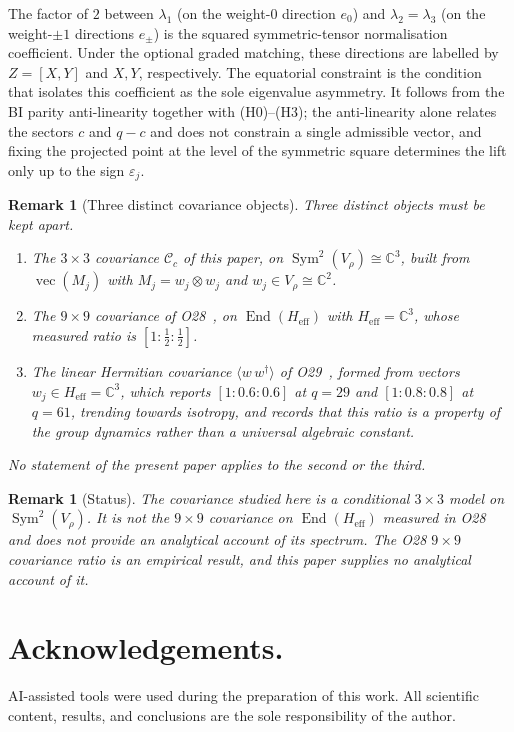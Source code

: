 \documentclass[11pt,a4paper]{article}
\newtheorem{remark}[theorem]{Remark}
\DeclareMathOperator{\Sym}{Sym}
\DeclareMathOperator{\End}{End}
\newcommand{\Heff}{H_{\mathrm{eff}}}
\newcommand{\Cc}{\mathcal{C}_c}
\begin{document}
  The factor of $2$ between $\lambda_1$ (on the weight-$0$ direction $e_0$) and
  $\lambda_2 = \lambda_3$ (on the weight-$\pm 1$ directions $e_\pm$) is the squared
  symmetric-tensor normalisation coefficient.
  Under the optional graded matching, these directions
  are labelled by $Z=[X,Y]$ and $X,Y$, respectively.
  The equatorial constraint is the condition that isolates this coefficient as the sole eigenvalue
  asymmetry.
  It follows from the BI parity anti-linearity together with (H0)--(H3); the anti-linearity alone
  relates the sectors $c$ and $q-c$ and does not constrain a single admissible vector, and fixing
  the projected point at the level of the symmetric square determines the lift only up to the sign
  $\varepsilon_j$.

  \begin{remark}[Three distinct covariance objects]
    \label{rem:two-covariances}
    Three distinct objects must be kept apart.
    \begin{enumerate}
      \item The $3\times3$ covariance $\Cc$ of this paper, on $\Sym^2(V_\rho) \cong \mathbb{C}^3$,
      built from $\operatorname{vec}(M_j)$ with $M_j = w_j \otimes w_j$ and $w_j \in V_\rho \cong
      \mathbb{C}^2$.
      \item The $9\times9$ covariance of O28~\cite{Beau2026a32}, on $\End(\Heff)$ with
      $\Heff = \mathbb{C}^3$, whose measured ratio is
      $[1 : \tfrac{1}{2} : \tfrac{1}{2}]$.
      \item The linear Hermitian covariance $\langle w\,w^{\dagger}\rangle$ of
      O29~\cite{Beau2026a33}, formed from vectors $w_j \in \Heff = \mathbb{C}^3$, which reports
      $[1 : 0.6 : 0.6]$ at $q = 29$ and $[1 : 0.8 : 0.8]$ at $q = 61$, trending towards isotropy,
      and records that this ratio is a property of the group dynamics rather than a universal
      algebraic constant.
    \end{enumerate}
    No statement of the present paper applies to the second or the third.
  \end{remark}

  \begin{remark}[Status]
    \label{rem:status}
    The covariance studied here is a conditional $3\times3$ model on $\Sym^2(V_\rho)$.
    It is not the $9\times9$ covariance on $\End(\Heff)$ measured in O28~\cite{Beau2026a32} and does
    not provide an analytical account of its spectrum.
    The O28 $9\times9$ covariance ratio is an empirical result, and this paper supplies no
    analytical account of it.
  \end{remark}

  \section*{Acknowledgements.}
    AI-assisted tools were used during the preparation of this work.
    All scientific content, results, and conclusions are the sole responsibility of the author.

    
    
\end{document}
